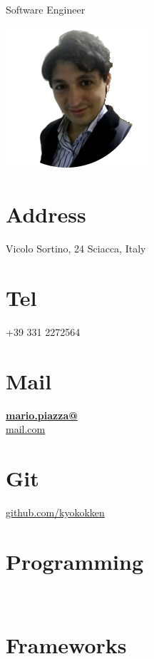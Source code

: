 \documentclass[]{friggeri-cv}
\begin{document}
      {Software Engineer}
      

\begin{aside}
  \includegraphics[scale=0.48]{img/foto_profilo.png}
  \section{Address}
    Vicolo Sortino, 24
    Sciacca, Italy
    ~
  \section{Tel}
    +39 331 2272564
    ~
  \section{Mail}
    \href{mailto:mario.piazza@mail.com}{\textbf{mario.piazza@}\\mail.com}
    ~
  \section{Git}
    \href{https://github.com/kyokokken}{github.com/kyokokken}
    ~
  \section{Programming}
    ~
  \section{Frameworks}
    ~
\end{aside}
~
\end{document}
